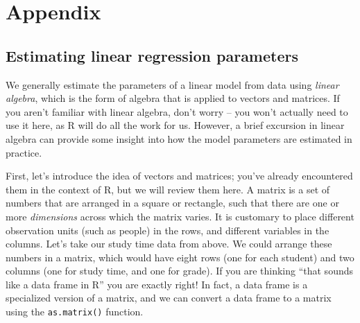 \documentclass[12pt,]{book}
\theoremstyle{definition}
\theoremstyle{definition}
\theoremstyle{definition}
\theoremstyle{remark}
\begin{document}
\hypertarget{appendix-5}{%
\section{Appendix}\label{appendix-5}}

\hypertarget{estimating-linear-regression-parameters}{%
\subsection{Estimating linear regression parameters}\label{estimating-linear-regression-parameters}}

We generally estimate the parameters of a linear model from data using \emph{linear algebra}, which is the form of algebra that is applied to vectors and matrices. If you aren't familiar with linear algebra, don't worry -- you won't actually need to use it here, as R will do all the work for us. However, a brief excursion in linear algebra can provide some insight into how the model parameters are estimated in practice.

First, let's introduce the idea of vectors and matrices; you've already encountered them in the context of R, but we will review them here. A matrix is a set of numbers that are arranged in a square or rectangle, such that there are one or more \emph{dimensions} across which the matrix varies. It is customary to place different observation units (such as people) in the rows, and different variables in the columns. Let's take our study time data from above. We could arrange these numbers in a matrix, which would have eight rows (one for each student) and two columns (one for study time, and one for grade). If you are thinking ``that sounds like a data frame in R'' you are exactly right! In fact, a data frame is a specialized version of a matrix, and we can convert a data frame to a matrix using the \texttt{as.matrix()} function.
\end{document}
